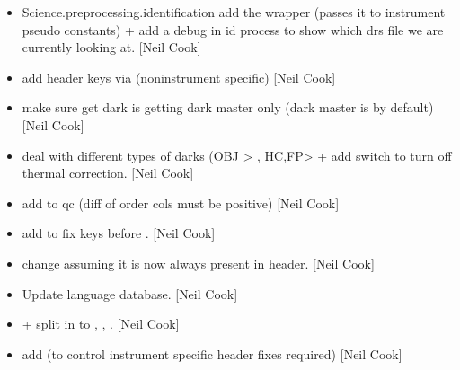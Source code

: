 \documentclass[a4paper,10pt,english]{report}
\begin{document}
\label{\detokenize{misc/changelog:id48}}\begin{itemize}
\item {} 
Science.preprocessing.identification \sphinxhyphen{} add the  wrapper
(passes it to instrument pseudo constants) + add a debug in id process
to show which drs file we are currently looking at. {[}Neil Cook{]}

\item {} 
 \sphinxhyphen{} add header keys via 
(non\sphinxhyphen{}instrument specific) {[}Neil Cook{]}

\item {} 
 \sphinxhyphen{} make sure get dark is getting dark master only
(dark master is  by default) {[}Neil Cook{]}

\item {} 
 \sphinxhyphen{} deal with different types of darks (OBJ \textendash{}\textgreater{}
, HC,FP\textendash{}\textgreater{}  + add switch to turn off thermal
correction. {[}Neil Cook{]}

\item {} 
 \sphinxhyphen{} add  to qc (diff of order
cols must be positive) {[}Neil Cook{]}

\item {} 
 \sphinxhyphen{} add  to fix keys before
. {[}Neil Cook{]}

\item {} 
 \sphinxhyphen{} change  assuming it is now always
present in header. {[}Neil Cook{]}

\item {} 
Update language database. {[}Neil Cook{]}

\item {} 
 +  \sphinxhyphen{} split
 in to , , . {[}Neil
Cook{]}

\item {} 
 \sphinxhyphen{} add  (to control
instrument specific header fixes required) {[}Neil Cook{]}


\end{itemize}
\end{document}
